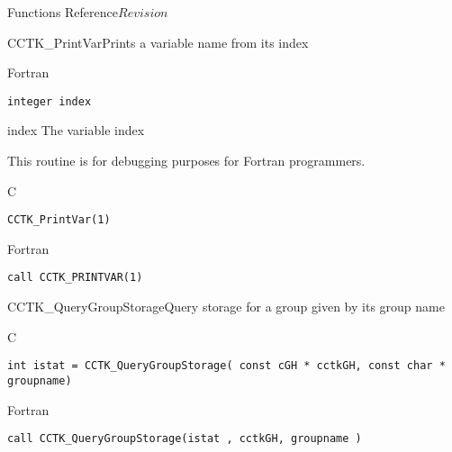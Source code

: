 \begin{cactuspart}{ Functions Reference}{}{$Revision$}
\begin{FunctionDescription}{CCTK\_PrintVar}{Prints a variable name from its index}
\begin{SynopsisSection}
\begin{Synopsis}{Fortran}
\begin{verbatim}
integer index\end{verbatim}
\end{Synopsis}
\end{SynopsisSection}
\begin{ParameterSection}
\begin{Parameter}{index}
The variable index
\end{Parameter}
\end{ParameterSection}
\begin{Discussion}
This routine is for debugging purposes for Fortran programmers.
\end{Discussion}
\begin{ExampleSection}
\begin{Example}{C}
\begin{verbatim}
CCTK_PrintVar(1)
\end{verbatim}
\end{Example}
\begin{Example}{Fortran}
\begin{verbatim}
call CCTK_PRINTVAR(1)
\end{verbatim}
\end{Example}
\end{ExampleSection}
\end{FunctionDescription}







\begin{FunctionDescription}{CCTK\_QueryGroupStorage}{Query storage for a group given by its group name}
\label{CCTK-QueryGroupStorage}
\begin{SynopsisSection}
\begin{Synopsis}{C}
\begin{verbatim}int istat = CCTK_QueryGroupStorage( const cGH * cctkGH, const char * groupname)\end{verbatim}
\end{Synopsis}
\begin{Synopsis}{Fortran}
\begin{verbatim}call CCTK_QueryGroupStorage(istat , cctkGH, groupname )


\end{verbatim}
\end{Synopsis}
\end{SynopsisSection}
\end{FunctionDescription}
\end{cactuspart}
